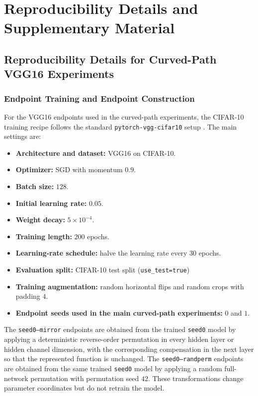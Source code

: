 \documentclass[11pt,a4paper]{report}
\begin{document}



\appendix
\chapter{Reproducibility Details and Supplementary Material}
\label{app:append}

\section{Reproducibility Details for Curved-Path VGG16 Experiments}
\label{app:curved_path_repro}

\subsection{Endpoint Training and Endpoint Construction}

For the VGG16 endpoints used in the curved-path experiments, the CIFAR-10 training recipe follows the standard \texttt{pytorch-vgg-cifar10} setup \citep{fu_pytorch_vgg_cifar10}. The main settings are:
\begin{itemize}
    \item \textbf{Architecture and dataset:} VGG16 on CIFAR-10.
    \item \textbf{Optimizer:} SGD with momentum \(0.9\).
    \item \textbf{Batch size:} \(128\).
    \item \textbf{Initial learning rate:} \(0.05\).
    \item \textbf{Weight decay:} \(5\times 10^{-4}\).
    \item \textbf{Training length:} \(200\) epochs.
    \item \textbf{Learning-rate schedule:} halve the learning rate every \(30\) epochs.
    \item \textbf{Evaluation split:} CIFAR-10 test split (\texttt{use\_test=true})
    \item \textbf{Training augmentation:} random horizontal flips and random crops with padding \(4\).
    \item \textbf{Endpoint seeds used in the main curved-path experiments:} \(0\) and \(1\).
\end{itemize}

The \texttt{seed0--mirror} endpoints are obtained from the trained \texttt{seed0} model by applying a deterministic reverse-order permutation in every hidden layer or hidden channel dimension, with the corresponding compensation in the next layer so that the represented function is unchanged. The \texttt{seed0--randperm} endpoints are obtained from the same trained \texttt{seed0} model by applying a random full-network permutation with permutation seed \(42\). These transformations change parameter coordinates but do not retrain the model.
\end{document}
